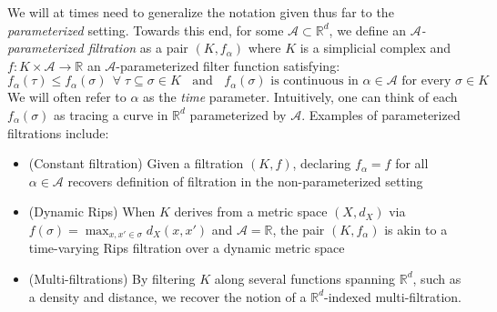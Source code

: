 We will at times need to generalize the notation given thus far to the \emph{parameterized} setting. Towards this end, for some $\mathcal{A} \subset \mathbb{R}^d$, we define an \emph{$\mathcal{A}$-parameterized filtration} as a pair $(K, f_\alpha)$ where $K$ is a simplicial complex and $f : K \times \mathcal{A} \to \mathbb{R}$ an $\mathcal{A}$-parameterized filter function satisfying:
\begin{equation}
f_\alpha(\tau) \leq f_\alpha(\sigma) \;\, \forall \; \tau \subseteq \sigma \in K  \;\; \text{ and } \; \; f_\alpha(\sigma) \text{ is continuous in } \alpha \in \mathcal{A} \text{ for every } \sigma \in K
\end{equation}
We will often refer to $\alpha$ as the \emph{time} parameter. Intuitively, one can think of each $f_\alpha(\sigma)$ as tracing a curve in $\mathbb{R}^d$ parameterized by $\mathcal{A}$.  Examples of parameterized filtrations include:
\begin{itemize}[itemsep=0.25em, parsep=0.25em]
	\item (Constant filtration) Given a filtration $(K, f)$, declaring $f_\alpha = f$ for all $\alpha \in \mathcal{A}$ recovers definition of filtration in the non-parameterized setting
	\item (Dynamic Rips) When $K$ derives from a metric space $(X,d_X)$ via $f(\sigma) = \max_{x, x' \in \sigma} d_X(x,x')$ and $\mathcal{A} = \mathbb{R}$, the pair $(K, f_\alpha)$ is akin to a time-varying Rips filtration over a dynamic metric space~\cite{kim2021spatiotemporal}  
	\item (Multi-filtrations) By filtering $K$ along several functions spanning $\mathbb{R}^d$, such as a density and distance, we recover the notion of a $\mathbb{R}^d$-indexed multi-filtration.  
\end{itemize} 

